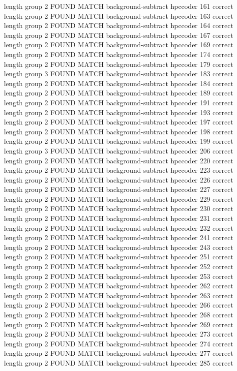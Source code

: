 length group  2
FOUND MATCH background-subtract hpccoder 161 correct
length group  2
FOUND MATCH background-subtract hpccoder 163 correct
length group  2
FOUND MATCH background-subtract hpccoder 164 correct
length group  2
FOUND MATCH background-subtract hpccoder 167 correct
length group  2
FOUND MATCH background-subtract hpccoder 169 correct
length group  2
FOUND MATCH background-subtract hpccoder 174 correct
length group  2
FOUND MATCH background-subtract hpccoder 179 correct
length group  3
FOUND MATCH background-subtract hpccoder 183 correct
length group  2
FOUND MATCH background-subtract hpccoder 184 correct
length group  2
FOUND MATCH background-subtract hpccoder 189 correct
length group  2
FOUND MATCH background-subtract hpccoder 191 correct
length group  2
FOUND MATCH background-subtract hpccoder 193 correct
length group  2
FOUND MATCH background-subtract hpccoder 197 correct
length group  2
FOUND MATCH background-subtract hpccoder 198 correct
length group  2
FOUND MATCH background-subtract hpccoder 199 correct
length group  3
FOUND MATCH background-subtract hpccoder 206 correct
length group  2
FOUND MATCH background-subtract hpccoder 220 correct
length group  2
FOUND MATCH background-subtract hpccoder 223 correct
length group  2
FOUND MATCH background-subtract hpccoder 226 correct
length group  2
FOUND MATCH background-subtract hpccoder 227 correct
length group  2
FOUND MATCH background-subtract hpccoder 229 correct
length group  2
FOUND MATCH background-subtract hpccoder 230 correct
length group  2
FOUND MATCH background-subtract hpccoder 231 correct
length group  2
FOUND MATCH background-subtract hpccoder 232 correct
length group  2
FOUND MATCH background-subtract hpccoder 241 correct
length group  2
FOUND MATCH background-subtract hpccoder 243 correct
length group  2
FOUND MATCH background-subtract hpccoder 251 correct
length group  2
FOUND MATCH background-subtract hpccoder 252 correct
length group  2
FOUND MATCH background-subtract hpccoder 253 correct
length group  2
FOUND MATCH background-subtract hpccoder 262 correct
length group  2
FOUND MATCH background-subtract hpccoder 263 correct
length group  2
FOUND MATCH background-subtract hpccoder 266 correct
length group  2
FOUND MATCH background-subtract hpccoder 268 correct
length group  2
FOUND MATCH background-subtract hpccoder 269 correct
length group  2
FOUND MATCH background-subtract hpccoder 273 correct
length group  2
FOUND MATCH background-subtract hpccoder 274 correct
length group  2
FOUND MATCH background-subtract hpccoder 277 correct
length group  2
FOUND MATCH background-subtract hpccoder 285 correct
